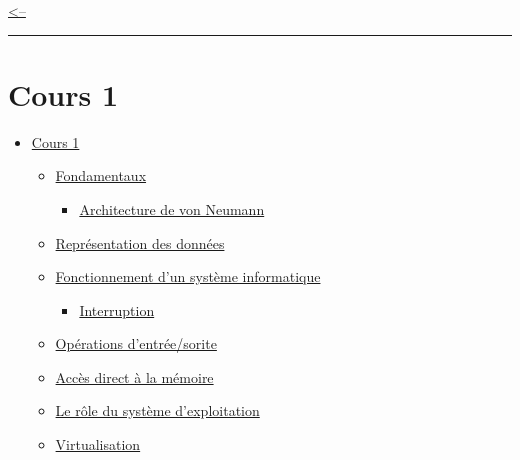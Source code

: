 \href{../README.md}{\textless--}

\begin{center}\rule{0.5\linewidth}{0.5pt}\end{center}

\section{Cours 1}\label{cours-1}

\begin{itemize}
\tightlist
\item
  \hyperref[cours-1]{Cours 1}

  \begin{itemize}
  \tightlist
  \item
    \hyperref[fondamentaux]{Fondamentaux}

    \begin{itemize}
    \tightlist
    \item
      \hyperref[architecture-de-von-neumann]{Architecture de von
      Neumann}
    \end{itemize}
  \item
    \hyperref[repruxe9sentation-des-donnuxe9es]{Représentation des
    données}
  \item
    \hyperref[fonctionnement-dun-systuxe8me-informatique]{Fonctionnement
    d'un système informatique}

    \begin{itemize}
    \tightlist
    \item
      \hyperref[interruption]{Interruption}
    \end{itemize}
  \item
    \hyperref[opuxe9rations-dentruxe9esorite]{Opérations
    d'entrée/sorite}
  \item
    \hyperref[accuxe8s-direct-uxe0-la-muxe9moire]{Accès direct à la
    mémoire}
  \item
    \hyperref[le-ruxf4le-du-systuxe8me-dexploitation]{Le rôle du système
    d'exploitation}
  \item
    \hyperref[virtualisation]{Virtualisation}


\end{itemize}
\end{itemize}
